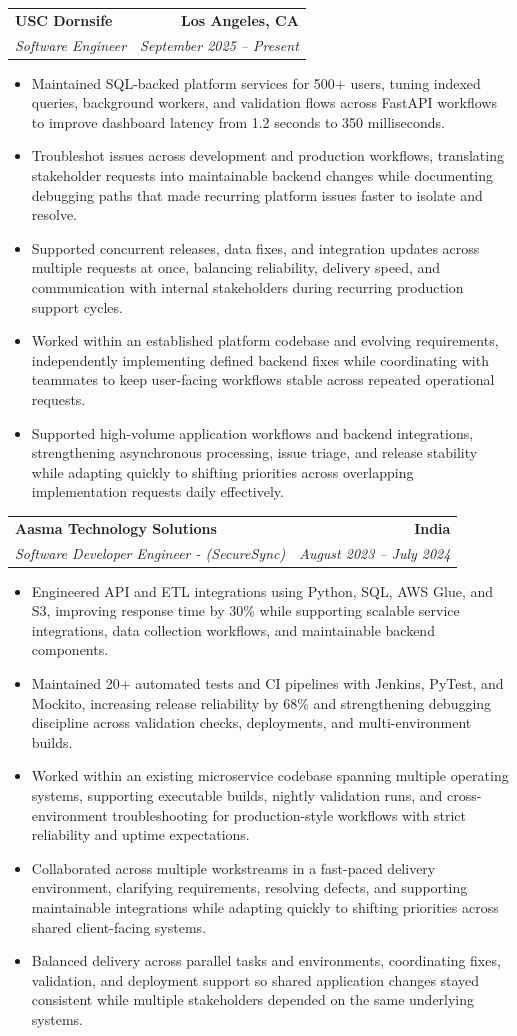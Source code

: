 \documentclass[letterpaper,10pt]{article}
\makeatletter
\newcommand{\resumeItem}[1]{\item\small{{#1 \vspace{-2pt}}}}
\newcommand{\resumeSubheading}[4]{\vspace{-1pt}\item\begin{tabular*}{1.0\textwidth}[t]{l@{\extracolsep{\fill}}r}\textbf{#1} & \textbf{\small #2} \\\textit{\small#3} & \textit{\small #4} \\\end{tabular*}\vspace{-2pt}}
\newcommand{\resumeItemListStart}{\begin{itemize}[leftmargin=0.15in,label=\textbullet,itemsep=2pt,topsep=0pt,parsep=0pt,partopsep=0pt]}
\newcommand{\resumeItemListEnd}{\end{itemize}\vspace{-4pt}}
\makeatother
\begin{document}
\resumeSubheading{USC Dornsife}{Los Angeles, CA}{Software Engineer}{September 2025 -- Present}
\resumeItemListStart
\resumeItem{Maintained SQL-backed platform services for 500+ users, tuning indexed queries, background workers, and validation flows across FastAPI workflows to improve dashboard latency from 1.2 seconds to 350 milliseconds.}
\resumeItem{Troubleshot issues across development and production workflows, translating stakeholder requests into maintainable backend changes while documenting debugging paths that made recurring platform issues faster to isolate and resolve.}
\resumeItem{Supported concurrent releases, data fixes, and integration updates across multiple requests at once, balancing reliability, delivery speed, and communication with internal stakeholders during recurring production support cycles.}
\resumeItem{Worked within an established platform codebase and evolving requirements, independently implementing defined backend fixes while coordinating with teammates to keep user-facing workflows stable across repeated operational requests.}
\resumeItem{Supported high-volume application workflows and backend integrations, strengthening asynchronous processing, issue triage, and release stability while adapting quickly to shifting priorities across overlapping implementation requests daily effectively.}
\resumeItemListEnd

\resumeSubheading{Aasma Technology Solutions}{India}{Software Developer Engineer - (SecureSync)}{August 2023 -- July 2024}
\resumeItemListStart
\resumeItem{Engineered API and ETL integrations using Python, SQL, AWS Glue, and S3, improving response time by 30\% while supporting scalable service integrations, data collection workflows, and maintainable backend components.}
\resumeItem{Maintained 20+ automated tests and CI pipelines with Jenkins, PyTest, and Mockito, increasing release reliability by 68\% and strengthening debugging discipline across validation checks, deployments, and multi-environment builds.}
\resumeItem{Worked within an existing microservice codebase spanning multiple operating systems, supporting executable builds, nightly validation runs, and cross-environment troubleshooting for production-style workflows with strict reliability and uptime expectations.}
\resumeItem{Collaborated across multiple workstreams in a fast-paced delivery environment, clarifying requirements, resolving defects, and supporting maintainable integrations while adapting quickly to shifting priorities across shared client-facing systems.}
\resumeItem{Balanced delivery across parallel tasks and environments, coordinating fixes, validation, and deployment support so shared application changes stayed consistent while multiple stakeholders depended on the same underlying systems.}
\resumeItemListEnd
\end{document}
